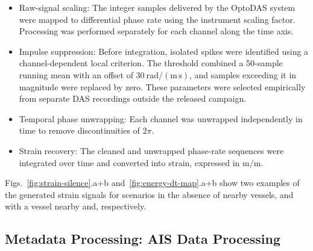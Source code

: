 \documentclass[11pt]{article}
\begin{document}
\begin{itemize}

  \item {Raw-signal scaling:} The integer samples delivered by the OptoDAS system were mapped to differential phase rate using the instrument scaling factor. Processing was performed separately for each channel along the time axis.

  \item {Impulse suppression:} Before integration, isolated spikes were identified using a channel-dependent local criterion. The threshold combined a 50-sample running mean with an offset of $30~\mathrm{rad/(m\,s)}$, and samples exceeding it in magnitude were replaced by zero. These parameters were selected empirically from separate DAS recordings outside the released campaign.

  \item {Temporal phase unwrapping:} Each channel was unwrapped independently in time to remove discontinuities of $2\pi$.

  \item {Strain recovery:} The cleaned and unwrapped phase-rate sequences were integrated over time and converted into strain, expressed in $\mathrm{m/m}$.
\end{itemize}

Figs.~\ref{fig:strain-silence}.a+b and~\ref{fig:energy-dt-map}.a+b show two examples of the generated strain signals for scenarios in the absence of nearby vessels, and with a vessel nearby and, respectively.


\subsection{Metadata Processing: AIS Data Processing}
\label{sec:ais-data-processing}
\end{document}
